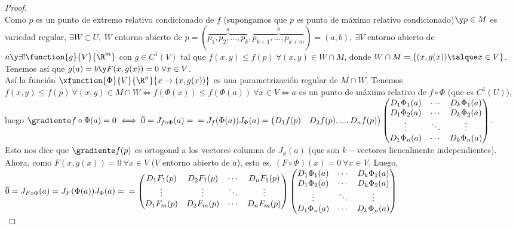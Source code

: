\begin{proof}\ \\
Como $p$ es un punto de extremo relativo condicionado de $f$ (supongamos que $p$ es punto de máximo relativo condicionado)$\y p\in M$ es variedad regular, $\exists W\subset U,\ W$ entorno abierto de $p=(\overset{a}{\overbrace{p_1,p_2,...,p_k}},\overset{b}{\overbrace{p_{k+1},...,p_{k+m}}})=(a,b),\ \exists V$ entorno abierto de $a\y\exists!\function{g}{V}{\R^m}$ con $g\in C^1(V)$ tal que $f(x,y)\leq f(p)\ \forall (x,y)\in W\cap M$, donde $W\cap M=\{(x,g(x))\talque x\in V\}$. Tenemos así que $g(a)=b\y F(x,g(x))=0\ \forall x\in V$.\\
Así la función $\xfunction{\Phi}{V}{\R^n}{x\to(x,g(x))}$ es una parametrización regular de $M\cap W$. Tenemos\\
$f(x,y)\leq f(p)\ \forall (x,y)\in M\cap W\iff f(\Phi(x))\leq f(\Phi(a))\ \forall x\in V\iff a$ es un punto de máximo relativo de $f\circ\Phi$ (que es $C^1(U)$), luego $\gradiente f\circ\Phi(a)=0\iff\overline{0}=J_{f\circ\Phi}(a)=\\=J_f(\Phi(a))J_\Phi(a)=\begin{pmatrix}D_1f(p)&D_2f(p),...,D_nf(p)\end{pmatrix}\begin{pmatrix}D_1\Phi_1(a)&\cdots&D_k\Phi_1(a)\\D_1\Phi_2(a)&\cdots&D_k\Phi_2(a)\\\vdots&\ddots&\vdots\\D_1\Phi_n(a)&\cdots&D_k\Phi_n(a)\end{pmatrix}$.\\
Esto nos dice que $\gradiente f(p)$ es ortogonal a los vectores columna de $J_\phi(a)$ (que son $k-$vectores lienealmente independientes).\\
Ahora, como $F(x,g(x))=0\ \forall x\in V$ ($V$ entorno abierto de $a$), esto es, $(F\circ\Phi)(x)=0\ \forall x\in V$. Luego, $\overline{0}=J_{F\circ\Phi}(a)=J_F(\Phi(a))J_\Phi(a)=\\
=\begin{pmatrix}D_1F_1(p)&D_2F_1(p)&\cdots&D_nF_1(p)\\\vdots&\vdots&\ddots&\vdots\\D_1F_m(p)&D_2F_m(p)&\cdots&D_nF_m(p)\end{pmatrix}\begin{pmatrix}D_1\Phi_1(a)&\cdots&D_k\Phi_1(a)\\D_1\Phi_2(a)&\cdots&D_k\Phi_2(a)\\\vdots&\ddots&\vdots\\D_1\Phi_n(a)&\cdots&D_k\Phi_n(a)\end{pmatrix}$\\

\end{proof}

